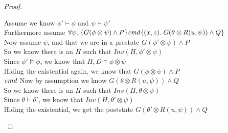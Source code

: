 \begin{proof}
\begin{tabbedproof}
\oo Assume we know $\phi' \vdash \phi$ and $\psi \vdash \psi'$ \\
\oo Furthermore assume $\forall \psi.\; \{{G(\phi \otimes \psi) \land P}\}{\mathit{cmd}}\{{(x,z)}.\;{G(\theta\otimes R(u, \psi)) \land Q}\}$ \\
\ooo Now assume $\psi$, and that we are in a prestate $G(\phi' \otimes \psi) \land P$ \\
\ooo So we know there is an $H$ such that $\mathit{Inv}(H, \phi' \otimes \psi)$ \\
\ooo Since $\phi' \models \phi$, we know that $H, D \models \phi \otimes \psi$ \\
\ooo Hiding the existential again, we know that $G(\phi \otimes \psi) \land P$ \\
\ooo $\mathit{cmd}$
\ooo Now by assumption we know $G(\theta \otimes R(u, \psi)) \land Q$ \\
\ooo So we know there is an $H$ such that $\mathit{Inv}(H, \theta \otimes \psi)$ \\
\ooo Since $\theta \vdash \theta'$, we know that $\mathit{Inv}(H, \theta' \otimes \psi)$ \\
\ooo Hiding the existential, we get the poststate $G(\theta'\otimes R(u, \psi)) \land Q$ \\
\end{tabbedproof}
\end{proof}

